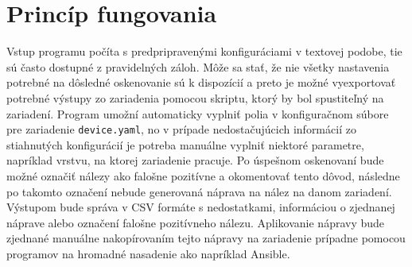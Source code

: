 \section{Princíp fungovania}

Vstup programu počíta s predpripravenými konfiguráciami v textovej podobe, tie sú často dostupné z pravidelných záloh. Môže sa stať, že nie všetky nastavenia potrebné na dôsledné oskenovanie sú k dispozícií a preto je možné vyexportovať potrebné výstupy zo zariadenia pomocou skriptu, ktorý by bol spustiteľný na zariadení. Program umožní automaticky vyplniť polia v konfiguračnom súbore pre zariadenie \texttt{device.yaml}, no v prípade nedostačujúcich informácií zo stiahnutých konfigurácií je potreba manuálne vyplniť niektoré parametre, napríklad vrstvu, na ktorej zariadenie pracuje. Po úspešnom oskenovaní bude možné označiť nálezy ako falošne pozitívne a okomentovať tento dôvod, následne po takomto označení nebude generovaná náprava na nález na danom zariadení. Výstupom bude správa v CSV formáte s nedostatkami, informáciou o zjednanej náprave alebo označení falošne pozitívneho nálezu. Aplikovanie nápravy bude zjednané manuálne nakopírovaním tejto nápravy na zariadenie prípadne pomocou programov na hromadné nasadenie ako napríklad Ansible. 


